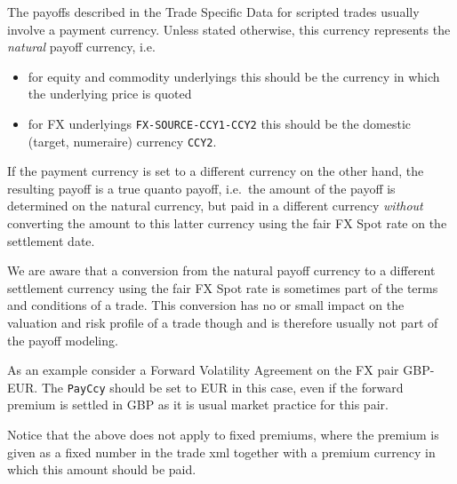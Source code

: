 The payoffs described in the Trade Specific Data for scripted trades usually involve a payment currency.
Unless stated otherwise, this currency represents the {\em natural} payoff currency, i.e.

\begin{itemize}
\item for equity and commodity underlyings this should be the currency in which the underlying price is quoted
\item for FX underlyings \lstinline!FX-SOURCE-CCY1-CCY2! this should be the domestic (target, numeraire) currency \lstinline!CCY2!.
\end{itemize}

If the payment currency is set to a different currency on the other hand, the resulting payoff is a true quanto payoff,
i.e.\ the amount of the payoff is determined on the natural currency, but paid in a different currency {\em without}
converting the amount to this latter currency using the fair FX Spot rate on the settlement date.

We are aware that a conversion from the natural payoff currency to a different settlement currency using the fair FX
Spot rate is sometimes part of the terms and conditions of a trade. This conversion has no or small impact on the
valuation and risk profile of a trade though and is therefore usually not part of the payoff modeling.

As an example consider a Forward Volatility Agreement on the FX pair GBP-EUR. The \lstinline!PayCcy! should be set to EUR in this
case, even if the forward premium is settled in GBP as it is usual market practice for this pair.

Notice that the above does not apply to fixed premiums, where the premium is given as a fixed number in the trade xml
together with a premium currency in which this amount should be paid.
